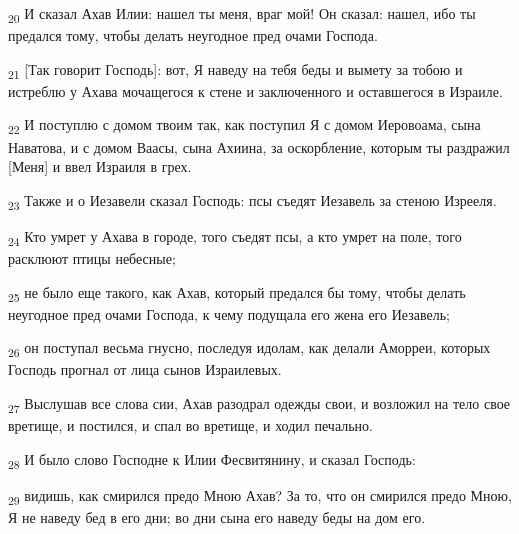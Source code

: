 \begin{tcolorbox}
\textsubscript{20} И сказал Ахав Илии: нашел ты меня, враг мой! Он сказал: нашел, ибо ты предался тому, чтобы делать неугодное пред очами Господа.
\end{tcolorbox}
\begin{tcolorbox}
\textsubscript{21} [Так говорит Господь]: вот, Я наведу на тебя беды и вымету за тобою и истреблю у Ахава мочащегося к стене и заключенного и оставшегося в Израиле.
\end{tcolorbox}
\begin{tcolorbox}
\textsubscript{22} И поступлю с домом твоим так, как поступил Я с домом Иеровоама, сына Наватова, и с домом Ваасы, сына Ахиина, за оскорбление, которым ты раздражил [Меня] и ввел Израиля в грех.
\end{tcolorbox}
\begin{tcolorbox}
\textsubscript{23} Также и о Иезавели сказал Господь: псы съедят Иезавель за стеною Изрееля.
\end{tcolorbox}
\begin{tcolorbox}
\textsubscript{24} Кто умрет у Ахава в городе, того съедят псы, а кто умрет на поле, того расклюют птицы небесные;
\end{tcolorbox}
\begin{tcolorbox}
\textsubscript{25} не было еще такого, как Ахав, который предался бы тому, чтобы делать неугодное пред очами Господа, к чему подущала его жена его Иезавель;
\end{tcolorbox}
\begin{tcolorbox}
\textsubscript{26} он поступал весьма гнусно, последуя идолам, как делали Аморреи, которых Господь прогнал от лица сынов Израилевых.
\end{tcolorbox}
\begin{tcolorbox}
\textsubscript{27} Выслушав все слова сии, Ахав разодрал одежды свои, и возложил на тело свое вретище, и постился, и спал во вретище, и ходил печально.
\end{tcolorbox}
\begin{tcolorbox}
\textsubscript{28} И было слово Господне к Илии Фесвитянину, и сказал Господь:
\end{tcolorbox}
\begin{tcolorbox}
\textsubscript{29} видишь, как смирился предо Мною Ахав? За то, что он смирился предо Мною, Я не наведу бед в его дни; во дни сына его наведу беды на дом его.
\end{tcolorbox}
